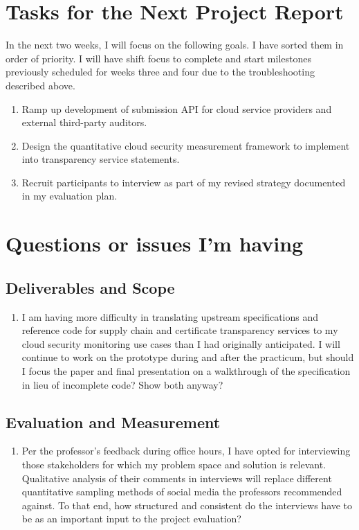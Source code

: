 \documentclass{jdf}
\begin{document}
\section*{Tasks for the Next Project Report}

In the next two weeks, I will focus on the following goals. I have sorted them in order of priority. I will have shift focus to complete and start milestones previously scheduled for weeks three and four due to the troubleshooting described above.

\begin{enumerate}
    \item Ramp up development of submission API for cloud service providers and external third-party auditors.
    \item Design the quantitative cloud security measurement framework to implement into transparency service statements.
    \item Recruit participants to interview as part of my revised strategy documented in my evaluation plan.
\end{enumerate}

\section*{Questions or issues I'm having}

\subsection*{Deliverables and Scope}

\begin{enumerate}
    \item I am having more difficulty in translating upstream specifications and reference code for supply chain and certificate transparency services to my cloud security monitoring use cases than I had originally anticipated. I will continue to work on the prototype during and after the practicum, but should I focus the paper and final presentation on a walkthrough of the specification in lieu of incomplete code? Show both anyway?
\end{enumerate}

\subsection*{Evaluation and Measurement}

\begin{enumerate}
    \item Per the professor's feedback during office hours, I have opted for interviewing those stakeholders for which my problem space and solution is relevant. Qualitative analysis of their comments in interviews will replace different quantitative sampling methods of social media the professors recommended against. To that end, how structured and consistent do the interviews have to be as an important input to the project evaluation?
\end{enumerate}
\end{document}
